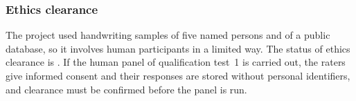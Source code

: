     \subsubsection{Ethics clearance}

        The project used handwriting samples of five named persons and of a public database, so it involves human participants in a limited way.
        The status of ethics clearance is .
        If the human panel of qualification test~1 is carried out, the raters give informed consent and their responses are stored without personal identifiers, and clearance must be confirmed before the panel is run.

